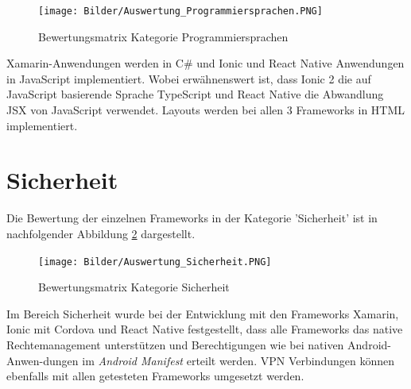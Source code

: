 \begin{figure}[h]
	\centering
	\texttt{[image: Bilder/Auswertung\_Programmiersprachen.PNG]}
	\caption{Bewertungsmatrix Kategorie Programmiersprachen}
	\label{fig:AuswProgr}
\end{figure}

Xamarin-Anwendungen werden in C\# und Ionic und React Native Anwendungen in JavaScript implementiert. Wobei erwähnenswert ist, dass Ionic 2 die auf JavaScript basierende Sprache TypeScript und React Native die Abwandlung JSX von JavaScript verwendet. Layouts werden bei allen 3 Frameworks in HTML implementiert.  

\section{Sicherheit}

Die Bewertung der einzelnen Frameworks in der Kategorie 'Sicherheit' ist in nachfolgender Abbildung \ref{fig:AuswSicherheit} dargestellt.

\begin{figure}[h]
	\centering
	\texttt{[image: Bilder/Auswertung\_Sicherheit.PNG]}
	\caption{Bewertungsmatrix Kategorie Sicherheit}
	\label{fig:AuswSicherheit}
\end{figure}

Im Bereich Sicherheit wurde bei der Entwicklung mit den Frameworks Xamarin, Ionic mit Cordova und React Native festgestellt, dass alle Frameworks das native Rechtemanagement unterstützen und Berechtigungen wie bei nativen Android-Anwen-dungen im \textit{Android Manifest} erteilt werden. VPN Verbindungen können ebenfalls mit allen getesteten Frameworks umgesetzt werden. 